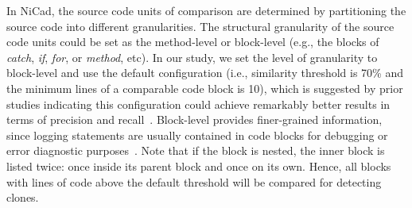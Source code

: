 In NiCad, the source code units of comparison are determined by partitioning the source code into different granularities. %
The structural granularity of the source code units could be set as the method-level or block-level (e.g., the blocks of {\em catch}, {\em if}, {\em for}, or {\em method}, etc). In our study, we set the level of granularity to block-level and use the default configuration (i.e., similarity threshold is 70\% and the minimum lines of a comparable code block is 10),
which is suggested by prior studies indicating this configuration could achieve remarkably better results in terms of precision and recall~\cite{EvaluatingModernCloneDetectionTools, ROY2009470, nicad}. Block-level provides finer-grained information, since logging statements are usually contained in code blocks for debugging or error diagnostic purposes~\cite{Fu:2014:DLE:2591062.2591175}. Note that if the block is nested, the inner block is listed twice: once inside its parent block and once on its own. Hence, all blocks with lines of code above the default threshold will be compared for detecting clones. %
